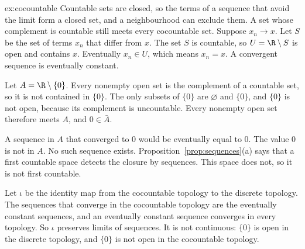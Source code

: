 \begin{solution}{ex:cocountable}
\idea Countable sets are closed, so the terms of a sequence that avoid the limit form a closed set, and a neighbourhood can exclude them. A set whose complement is countable still meets every cocountable set.
\writeup Suppose $x_n\to x$. Let $S$ be the set of terms $x_n$ that differ from $x$. The set $S$ is countable, so $U=\R\setminus S$ is open and contains $x$. Eventually $x_n\in U$, which means $x_n=x$. A convergent sequence is eventually constant.

Let $A=\R\setminus\{0\}$. Every nonempty open set is the complement of a countable set, so it is not contained in $\{0\}$. The only subsets of $\{0\}$ are $\varnothing$ and $\{0\}$, and $\{0\}$ is not open, because its complement is uncountable. Every nonempty open set therefore meets $A$, and $0\in\bar A$.

A sequence in $A$ that converged to $0$ would be eventually equal to $0$. The value $0$ is not in $A$. No such sequence exists. Proposition~\ref{prop:sequences}(a) says that a first countable space detects the closure by sequences. This space does not, so it is not first countable.

Let $\iota$ be the identity map from the cocountable topology to the discrete topology. The sequences that converge in the cocountable topology are the eventually constant sequences, and an eventually constant sequence converges in every topology. So $\iota$ preserves limits of sequences. It is not continuous: $\{0\}$ is open in the discrete topology, and $\{0\}$ is not open in the cocountable topology.
\end{solution}


